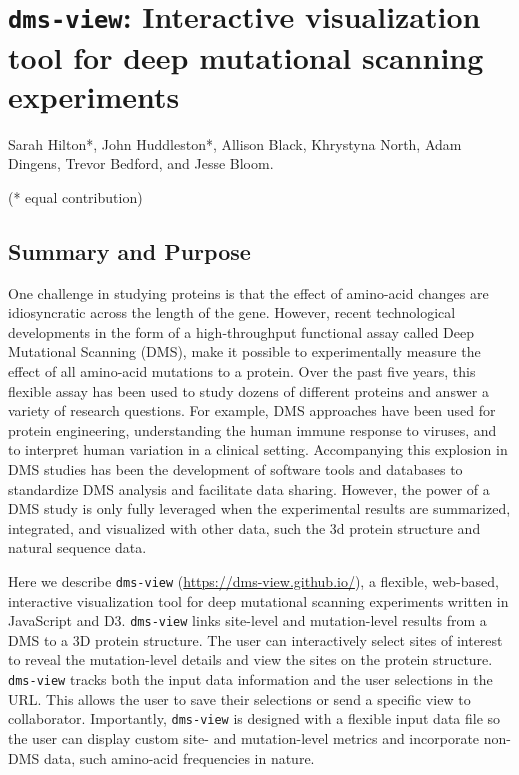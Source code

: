 \chapter{\texttt{dms-view}: Interactive visualization tool for deep mutational scanning experiments}

Sarah Hilton*, John Huddleston*, Allison Black, Khrystyna North, Adam Dingens, Trevor Bedford, and Jesse Bloom.

(* equal contribution)

\clearpage

\section{Summary and Purpose}

One challenge in studying proteins is that the effect of amino-acid changes are idiosyncratic across the length of the gene.
However, recent technological developments in the form of a high-throughput functional assay called Deep Mutational Scanning (DMS), make it possible to experimentally measure the effect of all amino-acid mutations to a protein.
Over the past five years, this flexible assay has been used to study dozens of different proteins and answer a variety of research questions.
For example, DMS approaches have been used for protein engineering, understanding the human immune response to viruses, and to interpret human variation in a clinical setting.
Accompanying this explosion in DMS studies has been the development of software tools and databases to standardize DMS analysis and facilitate data sharing.
However, the power of a DMS study is only fully leveraged when the experimental results are summarized, integrated, and visualized with other data, such the 3d protein structure and natural sequence data.

Here we describe \texttt{dms-view} (\url{https://dms-view.github.io/}), a flexible, web-based, interactive visualization tool for deep mutational scanning experiments written in JavaScript and D3.
\texttt{dms-view} links site-level and mutation-level results from a DMS to a 3D protein structure.
The user can interactively select sites of interest to reveal the mutation-level details and view the sites on the protein structure.
\texttt{dms-view} tracks both the input data information and the user selections in the URL.
This allows the user to save their selections or send a specific view to collaborator.
Importantly, \texttt{dms-view} is designed with a flexible input data file so the user can display custom site- and mutation-level metrics and incorporate non-DMS data, such amino-acid frequencies in nature.

